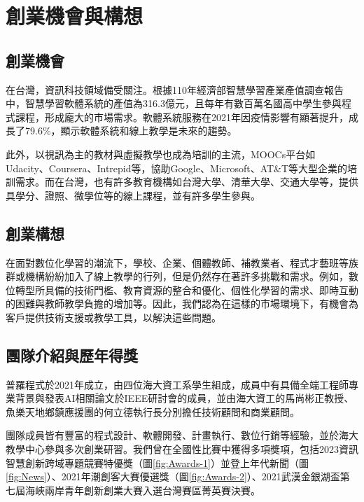 \section{創業機會與構想}
\subsection{創業機會}
在台灣，資訊科技領域備受關注。根據110年經濟部智慧學習產業產值調查報告\cite{ref:110產業產值調查報告}中，智慧學習軟體系統的產值為316.3億元，且每年有數百萬名國高中學生參與程式課程\cite{ref:學生數量}，形成龐大的市場需求。軟體系統服務在2021年因疫情影響有顯著提升，成長了79.6\%，顯示軟體系統和線上教學是未來的趨勢。

此外，以視訊為主的教材與虛擬教學也成為培訓的主流\cite{ref:企業培訓}，MOOCs平台如Udacity、Coursera、Intrepid等，協助Google、Microsoft、AT\&T等大型企業的培訓需求。而在台灣，也有許多教育機構如台灣大學、清華大學、交通大學等，提供具學分、證照、微學位等的線上課程，並有許多學生參與。

\subsection{創業構想}

在面對數位化學習的潮流下，學校、企業、個體教師、補教業者、程式才藝班等族群或機構紛紛加入了線上教學的行列，但是仍然存在著許多挑戰和需求\cite{ref:110產業產值調查報告}\cite{ref:111產業產值調查報告}。例如，數位轉型所具備的技術門檻、教育資源的整合和優化、個性化學習的需求、即時互動的困難與教師教學負擔的增加\cite{ref:老師的困難}等。因此，我們認為在這樣的市場環境下，有機會為客戶提供技術支援或教學工具，以解決這些問題。

\subsection{團隊介紹與歷年得獎}

普羅程式於2021年成立，由四位海大資工系學生組成，成員中有具備全端工程師專業背景與發表AI相關論文於IEEE研討會的成員，並由海大資工的馬尚彬正教授、魚樂天地鄉鎮應援團的何立德執行長分別擔任技術顧問和商業顧問。

團隊成員皆有豐富的程式設計、軟體開發、計畫執行、數位行銷等經驗，並於海大教學中心參與多次創業研習。我們曾在全國性比賽中獲得多項獎項，包括2023資訊智慧創新跨域專題競賽特優獎（圖\ref{fig:Awards-1}）並登上年代新聞（圖\ref{fig:News}）、2021年潮創客大賽優選獎（圖\ref{fig:Awards-2}）、2021武漢金銀湖盃第七屆海峽兩岸青年創新創業大賽入選台灣賽區菁英賽決賽。

